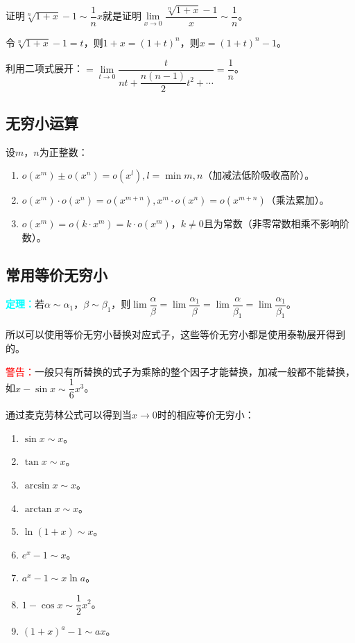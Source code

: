 \documentclass[UTF8, 12pt]{ctexart}
\begin{document}
证明$\sqrt[n]{1+x}-1\sim\dfrac{1}{n}x$就是证明$\lim\limits_{x\to 0}\dfrac{\sqrt[n]{1+x}-1}{x}\sim\dfrac{1}{n}$。

令$\sqrt[n]{1+x}-1=t$，则$1+x=(1+t)^n$，则$x=(1+t)^n-1$。

利用二项式展开：$=\lim\limits_{t\to 0}\dfrac{t}{nt+\dfrac{n(n-1)}{2}t^2+\cdots}=\dfrac{1}{n}$。

\subsection{无穷小运算}

设$m$，$n$为正整数：

\begin{enumerate}
    \item $o(x^m)\pm o(x^n)=o(x^l),l=\min{m,n}$（加减法低阶吸收高阶）。
    \item $o(x^m)\cdot o(x^n)=o(x^{m+n}),x^m\cdot o(x^n)=o(x^{m+n})$（乘法累加）。
    \item $o(x^m)=o(k\cdot x^m)=k\cdot o(x^m)$，$k\neq 0$且为常数（非零常数相乘不影响阶数）。
\end{enumerate}

\subsection{常用等价无穷小}

\textcolor{aqua}{\textbf{定理：}}若$\alpha\sim\alpha_1$，$\beta\sim\beta_1$，则$\lim\dfrac{\alpha}{\beta}=\lim\dfrac{\alpha_1}{\beta}=\lim\dfrac{\alpha}{\beta_1}=\lim\dfrac{\alpha_1}{\beta_1}$。

所以可以使用等价无穷小替换对应式子，这些等价无穷小都是使用泰勒展开得到的。

\textcolor{red}{警告：}一般只有所替换的式子为乘除的整个因子才能替换，加减一般都不能替换，如$x-\sin x\sim\dfrac{1}{6}x^3$。

通过麦克劳林公式可以得到当$x\to 0$时的相应等价无穷小：

\begin{enumerate}
    \item $\sin x\sim x$。
    \item $\tan x\sim x$。
    \item $\arcsin x\sim x$。
    \item $\arctan x\sim x$。
    \item $\ln(1+x)\sim x$。
    \item $e^x-1\sim x$。
    \item $a^x-1\sim x\ln a$。
    \item $1-\cos x\sim\dfrac{1}{2}x^2$。
    \item $(1+x)^a-1\sim ax$。
\end{enumerate}
\end{document}
